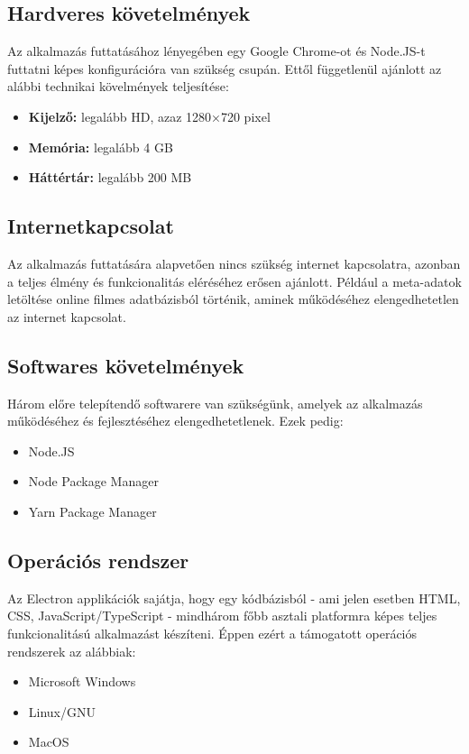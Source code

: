 \subsection{Hardveres követelmények}
Az alkalmazás futtatásához lényegében egy Google Chrome-ot és Node.JS-t futtatni képes konfigurációra van szükség csupán. Ettől függetlenül ajánlott az alábbi technikai kövelmények teljesítése:
\begin{itemize}
    \item {\textbf {Kijelző: }} legalább HD, azaz 1280×720 pixel
	\item {\textbf {Memória: }} legalább 4 GB
	\item {\textbf {Háttértár: }} legalább 200 MB
\end{itemize}

\subsection{Internetkapcsolat}
Az alkalmazás futtatására alapvetően nincs szükség internet kapcsolatra, azonban a teljes élmény és funkcionalitás eléréséhez erősen ajánlott. Például a meta-adatok letöltése online filmes adatbázisból történik, aminek működéséhez elengedhetetlen az internet kapcsolat.

\subsection{Softwares követelmények}
Három előre telepítendő softwarere van szükségünk, amelyek az alkalmazás működéséhez és fejlesztéséhez elengedhetetlenek. Ezek pedig:
\begin{itemize}
	\item Node.JS
	\item Node Package Manager
	\item Yarn Package Manager
\end{itemize}

\subsection{Operációs rendszer}
Az Electron applikációk sajátja, hogy egy kódbázisból - ami jelen esetben HTML, CSS, JavaScript/TypeScript - mindhárom főbb asztali platformra képes teljes funkcionalitású alkalmazást készíteni. Éppen ezért a támogatott operációs rendszerek az alábbiak:
\begin{itemize}
	\item Microsoft Windows
	\item Linux/GNU
	\item MacOS
\end{itemize}


